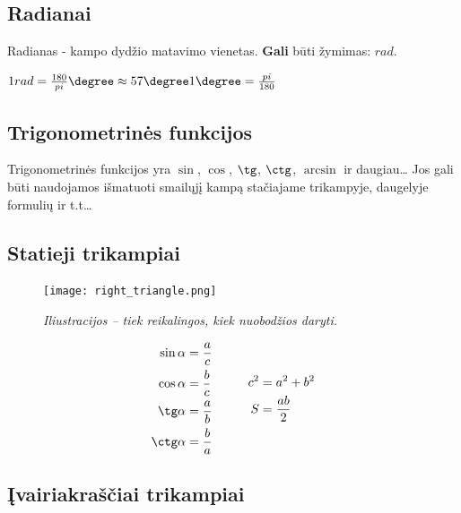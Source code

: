 
\subsection{Radianai}
Radianas - kampo dydžio matavimo vienetas. \textbf{Gali} būti žymimas: $rad$.

\begin{math} \\
    1rad = \frac{180}{pi}\degree \approx 57 \degree \\
    1\degree = \frac{pi}{180}
\end{math}

\subsection{Trigonometrinės funkcijos}
Trigonometrinės funkcijos yra $\sin$, $\cos$, $\tg$, $\ctg$, $\arcsin$ ir daugiau\dots
Jos gali būti naudojamos išmatuoti smailųjį kampą stačiajame trikampyje, daugelyje formulių ir t.t\dots

\subsection{Statieji trikampiai}
{
\begin{figure}
\caption{\textit{Iliustracijos -- tiek reikalingos, kiek nuobodžios daryti.}}
\texttt{[image: right\_triangle.png]}
\end{figure}

\begin{equation*} \\
    \begin{aligned}[c]
        \sin \alpha &= \frac{a}{c} \\
        \cos \alpha &= \frac{b}{c} \\
        \tg  \alpha &= \frac{a}{b} \\
        \ctg \alpha &= \frac{b}{a}
    \end{aligned}
    \hspace{10mm}
    \begin{aligned}[c]
        c^2 &= a^2 + b^2 \\
        S &= \frac{ab}{2}
    \end{aligned}
\end{equation*}
}

\clearpage
\subsection{Įvairiakraščiai trikampiai}


